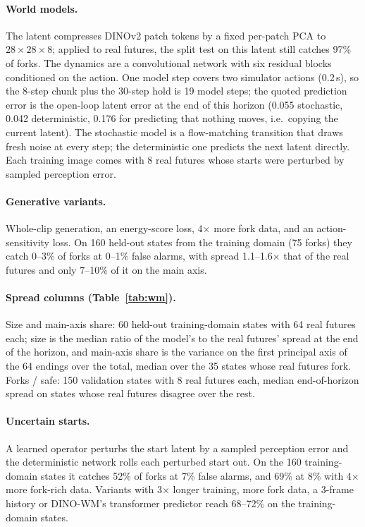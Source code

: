 \documentclass{article}
\begin{document}
\paragraph{World models.} The latent compresses DINOv2 patch tokens by a fixed per-patch PCA to
$28\times28\times8$; applied to real futures, the split test on this latent still catches 97\% of forks.
The dynamics are a convolutional network with six residual blocks conditioned on the action. One model
step covers two simulator actions (0.2\,s), so the 8-step chunk plus the 30-step hold is 19 model steps;
the quoted prediction error is the open-loop latent error at the end of this horizon (0.055 stochastic,
0.042 deterministic, 0.176 for predicting that nothing moves, i.e.\ copying the current latent). The stochastic model is a flow-matching transition
that draws fresh noise at every step; the deterministic one predicts the next latent directly. Each
training image comes with 8 real futures whose starts were perturbed by sampled perception error.

\paragraph{Generative variants.} Whole-clip generation, an energy-score loss, 4$\times$ more fork data,
and an action-sensitivity loss. On 160 held-out states from the training domain (75 forks) they catch
0--3\% of forks at 0--1\% false alarms, with spread 1.1--1.6$\times$ that of the real futures and only
7--10\% of it on the main axis.

\paragraph{Spread columns (Table~\ref{tab:wm}).} Size and main-axis share: 60 held-out training-domain
states with 64 real futures each; size is the median ratio of the model's to the real futures' spread at
the end of the horizon, and main-axis share is the variance on the first principal axis of the 64 endings
over the total, median over the 35 states whose real futures fork. Forks / safe: 150 validation states
with 8 real futures each, median end-of-horizon spread on states whose real futures disagree over the rest.

\paragraph{Uncertain starts.} A learned operator perturbs the start latent by a sampled perception error
and the deterministic network rolls each perturbed start out. On the 160 training-domain states it
catches 52\% of forks at 7\% false alarms, and 69\% at 8\% with 4$\times$ more fork-rich data. Variants with 3$\times$ longer training, more fork data, a 3-frame history
or DINO-WM's transformer predictor \citep{zhou2025dinowm} reach 68--72\% on the training-domain states.
\end{document}
